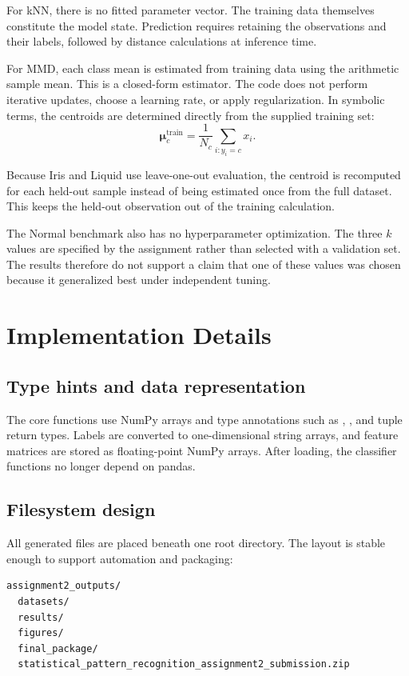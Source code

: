\documentclass[11pt,a4paper]{article}
\newcommand{\code}[1]{\texttt{\detokenize{#1}}}
\begin{document}
For kNN, there is no fitted parameter vector. The training data themselves constitute the model state. Prediction requires retaining the observations and their labels, followed by distance calculations at inference time.

For MMD, each class mean is estimated from training data using the arithmetic sample mean. This is a closed-form estimator. The code does not perform iterative updates, choose a learning rate, or apply regularization. In symbolic terms, the centroids are determined directly from the supplied training set:
\begin{equation}
 \boldsymbol{\mu}_c^{\mathrm{train}}
 =
 \frac{1}{N_c}
 \sum_{i:y_i=c}x_i.
\end{equation}

Because Iris and Liquid use leave-one-out evaluation, the centroid is recomputed for each held-out sample instead of being estimated once from the full dataset. This keeps the held-out observation out of the training calculation.

The Normal benchmark also has no hyperparameter optimization. The three $k$ values are specified by the assignment rather than selected with a validation set. The results therefore do not support a claim that one of these values was chosen because it generalized best under independent tuning.

\section{Implementation Details}

\subsection{Type hints and data representation}

The core functions use NumPy arrays and type annotations such as \code{np.ndarray}, \code{Path}, and tuple return types. Labels are converted to one-dimensional string arrays, and feature matrices are stored as floating-point NumPy arrays. After loading, the classifier functions no longer depend on pandas.

\subsection{Filesystem design}

All generated files are placed beneath one root directory. The layout is stable enough to support automation and packaging:
\begin{verbatim}
assignment2_outputs/
  datasets/
  results/
  figures/
  final_package/
  statistical_pattern_recognition_assignment2_submission.zip
\end{verbatim}
\end{document}
